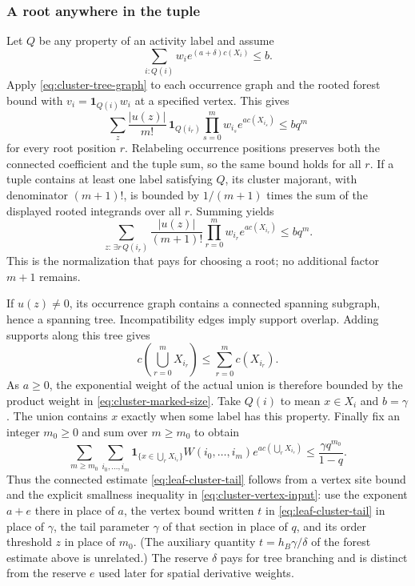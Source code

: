 \subsubsection{A root anywhere in the tuple}
Let $Q$ be any property of an activity label and assume
\[
              \sum_{i:Q(i)}w_i e^{(a+\delta)c(X_i)}\le b.
\]
Apply \eqref{eq:cluster-tree-graph} to each occurrence graph and the
rooted forest bound with $v_i=\mathbf1_{Q(i)}w_i$ at a specified
vertex. This gives
\[
 \sum_{z}\frac{|u(z)|}{m!}\,
          \mathbf1_{Q(i_r)}\prod_{s=0}^m w_{i_s}e^{a c(X_{i_s})}
                           \le bq^m
\]
for every root position $r$. Relabeling occurrence positions preserves
both the connected coefficient and the tuple sum, so the same bound
holds for all $r$. If a tuple contains at least one label satisfying
$Q$, its cluster majorant, with denominator $(m+1)!$, is bounded by
$1/(m+1)$ times the sum of the displayed rooted integrands over all
$r$. Summing yields
\begin{equation}\label{eq:cluster-marked-size}
 \sum_{z:\,\exists r\,Q(i_r)}
 \frac{|u(z)|}{(m+1)!}\prod_{r=0}^m w_{i_r}e^{a c(X_{i_r})}
                           \le bq^m.
\end{equation}
This is the normalization that pays for choosing a root; no additional
factor $m+1$ remains.

If $u(z)\ne0$, its occurrence graph contains a connected spanning
subgraph, hence a spanning tree. Incompatibility edges imply support
overlap. Adding supports along this tree gives
\[
        c\left(\bigcup_{r=0}^m X_{i_r}\right)
                              \le\sum_{r=0}^m c(X_{i_r}).
\]
As $a\ge0$, the exponential weight of the actual union is therefore
bounded by the product weight in \eqref{eq:cluster-marked-size}.
Take $Q(i)$ to mean $x\in X_i$ and $b=\gamma$. The union contains
$x$ exactly when some label has this property. Finally fix an integer $m_0\ge0$ and sum over
$m\ge m_0$ to obtain
\begin{equation}\label{eq:cluster-local-tail}
 \sum_{m\ge m_0}\sum_{i_0,\ldots,i_m}
 \mathbf1_{\{x\in\bigcup_rX_{i_r}\}}
      W(i_0,\ldots,i_m)e^{a c(\bigcup_rX_{i_r})}
                       \le\frac{\gamma q^{m_0}}{1-q}.
\end{equation}
Thus the connected estimate \eqref{eq:leaf-cluster-tail} follows
from a vertex site bound and the explicit smallness inequality in
\eqref{eq:cluster-vertex-input}: use the exponent $a+e$ there in
place of $a$, the vertex bound written $t$ in \eqref{eq:leaf-cluster-tail}
in place of $\gamma$, the tail parameter $\gamma$ of that section in place
of $q$, and its order threshold $z$ in place of $m_0$. (The auxiliary
quantity $t=h_B\gamma/\delta$ of the forest estimate above is unrelated.)
The reserve $\delta$ pays for tree branching and is distinct from the
reserve $e$ used later for spatial derivative weights.

